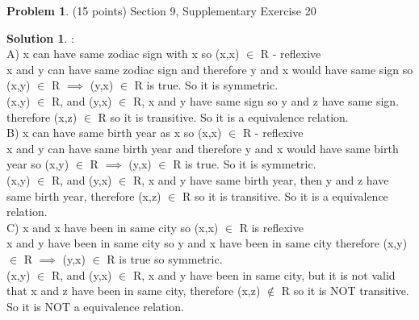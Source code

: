\documentclass{article}
\theoremstyle{definition}
\newtheorem{problem}{Problem}
\newtheorem*{solution}{Solution}
\begin{document}
\begin{problem} (15 points) Section 9, Supplementary Exercise 20
\end{problem}
\begin{solution} :
\\
A) x can have same zodiac sign with x so (x,x) $\in$ R - reflexive
\\
x and y can have same zodiac sign and therefore y and x would have same sign so (x,y) $\in$ R $\implies$ (y,x) $\in$ R is true. So it is symmetric.
\\
(x,y) $\in$ R, and (y,x) $\in$ R, x and y have same sign so y and z have same sign. therefore (x,z) $\in$ R so it is transitive. So it is a equivalence relation.
\\

B) x can have same birth year as x so (x,x) $\in$ R - reflexive
\\
x and y can have same birth year and therefore y and x would have same birth year so (x,y) $\in$ R $\implies$ (y,x) $\in$ R is true. So it is symmetric.
\\
 (x,y) $\in$ R, and (y,x) $\in$ R, x and y have same birth year, then y and z have same birth year, therefore (x,z) $\in$ R so it is transitive. So it is a equivalence relation.
 \\
 
 C) x and x have been in same city so (x,x) $\in$ R is reflexive
 \\
 x and y have been in same city so y and x have been in same city therefore (x,y) $\in$ R $\implies$ (y,x) $\in$ R is true so symmetric.
 \\
 (x,y) $\in$ R, and (y,x) $\in$ R, x and y have been in same city, but it is not valid that x and z have been in same city, therefore (x,z) $\notin$ R so it is NOT transitive. So it is NOT a equivalence relation.
\end{solution}

\newpage
\end{document}
